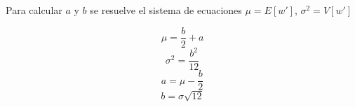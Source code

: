 Para calcular $a$ y $b$ se resuelve el sistema de ecuaciones $\mu = E[w']$, $\sigma^2 = V[w']$

\begin{equation} \label{eq:neuron_variance}
\mu = \dfrac{b}{2} + a
\end{equation}
\begin{equation} \label{eq:neuron_variance}
\sigma^2 = \dfrac{b^2}{12}
\end{equation}
\begin{equation} \label{eq:system_a}
a = \mu - \dfrac{b}{2}
\end{equation}
\begin{equation} \label{eq:system_b}
b = \sigma \sqrt{12}
\end{equation}
